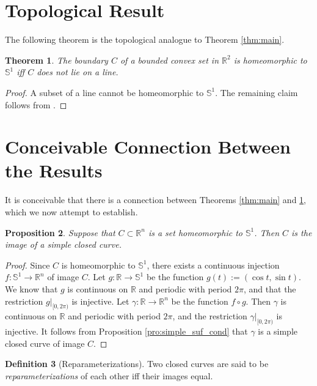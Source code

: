 \documentclass{amsart}
\newtheorem{proposition}{Proposition}[section]
\newtheorem{theorem}[proposition]{Theorem}
\theoremstyle{definition}
\newtheorem{definition}[proposition]{Definition}
\theoremstyle{remark}
\begin{document}
\section{Topological Result}

The following theorem is the topological analogue to Theorem \ref{thm:main}.

\begin{theorem}
    \label{thm:main_topo}
    The boundary $C$ of a bounded convex set in $\mathbb{R}^2$ is
    homeomorphic to $\mathbb{S}^1$ iff $C$ does not lie on a line.
\end{theorem}

\begin{proof}
    A subset of a line cannot be homeomorphic to $\mathbb{S}^1$.
    The remaining claim follows from \cite[Proposition 28 and Theorem 32]{lrs}.
\end{proof}

\section{Conceivable Connection Between the Results}
\label{sec:conceivable_connection}

It is conceivable that there is a connection between Theorems
\ref{thm:main} and \ref{thm:main_topo}, which we now attempt to establish.

\begin{proposition}
    \label{pro:homeomorphic_simple}
    Suppose that $C\subset\mathbb{R}^n$ is a set
    homeomorphic to $\mathbb{S}^1$. Then
    $C$ is the image of a simple closed curve.
\end{proposition}

\begin{proof}
    Since $C$ is homeomorphic to $\mathbb{S}^1$,
    there exists a continuous injection
    $f:\mathbb{S}^1\to\mathbb{R}^n$ of image $C$.
    Let $g:\mathbb{R}\to\mathbb{S}^1$ be the function
    $g(t):=(\cos t,\sin t)$. We know that $g$ is continuous
    on $\mathbb{R}$ and periodic with period $2\pi$, and that
    the restriction $g|_{[0,2\pi)}$ is injective.
    Let $\gamma:\mathbb{R}\to\mathbb{R}^n$ be the function
    $f\circ g$. Then $\gamma$ is continuous
    on $\mathbb{R}$ and periodic with period $2\pi$, and the
    restriction $\gamma|_{[0,2\pi)}$ is injective.
    It follows from Proposition \ref{pro:simple_suf_cond}
    that $\gamma$ is a simple closed curve of image $C$.
\end{proof}

\begin{definition}[Reparameterizations]
    Two closed curves are said to be
    \emph{reparameterizations} of each other
    iff their images equal.
\end{definition}
\end{document}
